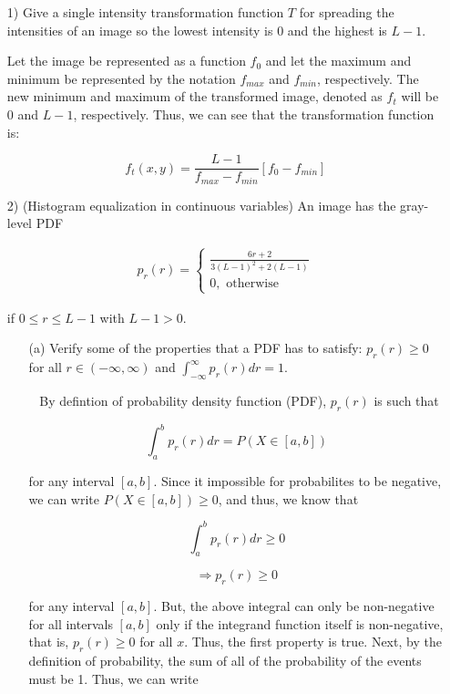 \documentclass{article}
\begin{document}
\begin{enumerate}
\item[1)] Give a single intensity transformation function $T$ for spreading the intensities of an
image so the lowest intensity is 0 and the highest is $L-1$.

Let the image be represented as a function $f_0$ and let the maximum and minimum be represented by the
notation $f_{max}$ and $f_{min}$, respectively.  The new minimum and maximum of the transformed image,
denoted as $f_t$ will be $0$ and $L-1$, respectively.  Thus, we can see that the transformation function is:

\begin{equation}
f_t(x,y)=\frac{L-1}{f_{max}-f_{min}}[f_0-f_{min}]
\end{equation}

\item[2)] (Histogram equalization in continuous variables) An image has the gray-level PDF

\begin{gather*}
p_r(r)	=\begin{cases}
\frac{6r+2}{3(L-1)^2 + 2(L-1)}\\0, \text{ otherwise}
\end{cases}
\end{gather*}

if $0 \leq r \leq L - 1$ with $L - 1 > 0$.
\begin{enumerate}
\item[(a)] Verify some of the properties that a PDF has to satisfy: $p_r(r) \geq 0$ for all $r \in (-\infty, \infty)$ and $\int_{-\infty}^{\infty} p_r(r)dr=1$.
\item[~]
By defintion of probability density function (PDF), $p_r(r)$ is such that 

\begin{equation}
\int_{a}^{b} p_r(r)dr = P(X \in [a, b])
\end{equation}

for any interval $[a,b]$. Since it impossible for probabilites to be negative, we can write $P(X \in [a, b]) \geq 0$, and thus, we know that

\begin{equation}
\int_{a}^{b} p_r(r)dr \geq 0
\end{equation}

\begin{equation}
\Rightarrow p_r(r) \geq 0
\end{equation}

for any interval $[a,b]$. But, the above integral can only be non-negative for all intervals $[a,b]$ only if the integrand function itself is non-negative, that is, $p_r(r) \geq 0$
for all $x$.  Thus, the first property is true. \newline
Next, by the definition of probability, the sum of all of the probability of the events must be 1. Thus, we can write


\end{enumerate}
\end{enumerate}
\end{document}
